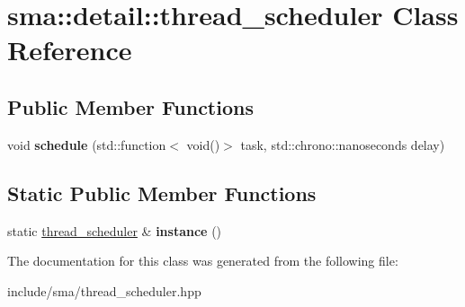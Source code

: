 \hypertarget{classsma_1_1detail_1_1thread__scheduler}{\section{sma\-:\-:detail\-:\-:thread\-\_\-scheduler Class Reference}
\label{classsma_1_1detail_1_1thread__scheduler}
}
\subsection*{Public Member Functions}
\begin{DoxyCompactItemize}
\item 
\hypertarget{classsma_1_1detail_1_1thread__scheduler_ab310242dad8169d2930218da9cd62279}{void {\bfseries schedule} (std\-::function$<$ void()$>$ task, std\-::chrono\-::nanoseconds delay)}\label{classsma_1_1detail_1_1thread__scheduler_ab310242dad8169d2930218da9cd62279}

\end{DoxyCompactItemize}
\subsection*{Static Public Member Functions}
\begin{DoxyCompactItemize}
\item 
\hypertarget{classsma_1_1detail_1_1thread__scheduler_aa6f45c93ea6500f5b741e9812d911d3f}{static \hyperlink{classsma_1_1detail_1_1thread__scheduler}{thread\-\_\-scheduler} \& {\bfseries instance} ()}\label{classsma_1_1detail_1_1thread__scheduler_aa6f45c93ea6500f5b741e9812d911d3f}

\end{DoxyCompactItemize}


The documentation for this class was generated from the following file\-:\begin{DoxyCompactItemize}
\item 
include/sma/thread\-\_\-scheduler.\-hpp\end{DoxyCompactItemize}
